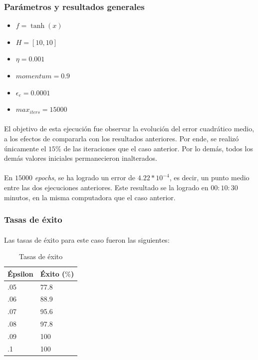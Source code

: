 \documentclass[12pt, twocolumn]{article}
\begin{document}
	\subsubsection{Parámetros y resultados generales} 
	
	\begin{itemize}
		\item $f = \tanh(x)$
		\item $H = \left[10, 10\right]$
		\item $\eta = 0.001$
		\item $momentum = 0.9$
		\item $\epsilon_{e} = 0.0001$
		\item $max_{iters} = 15000$
	\end{itemize}
	
	\paragraph{} El objetivo de esta ejecución fue observar la evolución del error cuadrático medio, a los efectos de compararla con los resultados anteriores. Por ende, se realizó únicamente el $15\%$ de las iteraciones que el caso anterior. Por lo demás, todos los demás valores iniciales permanecieron inalterados. 
	
	\paragraph{} En $15000$ \textit{epochs}, se ha logrado un error de $4.22*10^{-4}$, es decir, un punto medio entre las dos ejecuciones anteriores. Este resultado se la logrado en $00:10:30$ minutos, en la misma computadora que el caso anterior. 
	
	\subsubsection{Tasas de éxito}
	
	\paragraph{} Las tasas de éxito para este caso fueron las siguientes:
	
	\begin{table}[H]
		\centering
		\begin{tabular}{ll}
			\hline
			Épsilon & Éxito ($\%$)\\ \hline
			.05     & 77.8  \\
			.06     & 88.9    \\
			.07     & 95.6  \\
			.08     & 97.8  \\
			.09     & 100  \\ 
			.1      & 100  \\ \hline 
		\end{tabular}
		\caption{Tasas de éxito}
		\label{ex3}
	\end{table}
	
\end{document}
